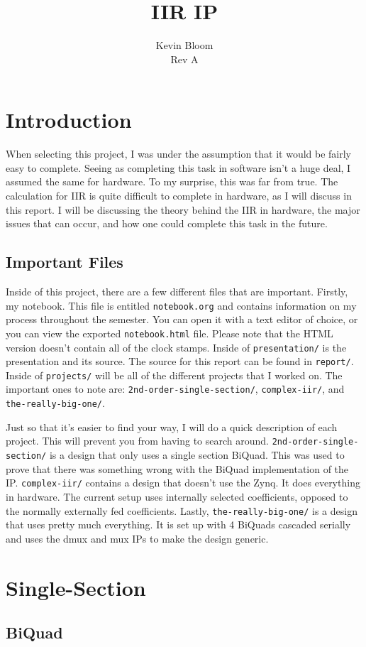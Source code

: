 \documentclass[12pt,a4paper,titlepage]{article}
\begin{document}
\title{IIR IP}
\author{Kevin Bloom \\ Rev A}
\maketitle

\newpage

\tableofcontents

\newpage

\section{Introduction}
When selecting this project, I was under the assumption that it would be fairly
easy to complete. Seeing as completing this task in software isn't a huge deal,
I assumed the same for hardware. To my surprise, this was far from true. The
calculation for IIR is quite difficult to complete in hardware, as I will
discuss in this report. I will be discussing the theory behind the IIR in
hardware, the major issues that can occur, and how one could complete this task
in the future.

\subsection{Important Files}
Inside of this project, there are a few different files that are important.
Firstly, my notebook. This file is entitled \texttt{notebook.org} and contains
information on my process throughout the semester. You can open it with a text
editor of choice, or you can view the exported \texttt{notebook.html}
file. Please note that the HTML version doesn't contain all of the clock
stamps. Inside of \texttt{presentation/} is the presentation and its source. The
source for this report can be found in \texttt{report/}. Inside of
\texttt{projects/} will be all of the different projects that I worked on. The
important ones to note are: \texttt{2nd-order-single-section/},
\texttt{complex-iir/}, and \texttt{the-really-big-one/}.

Just so that it's easier to find your way, I will do a quick description of each
project. This will prevent you from having to search
around. \texttt{2nd-order-single-section/} is a design that only uses a single
section BiQuad. This was used to prove that there was something wrong with the
BiQuad implementation of the IP. \texttt{complex-iir/} contains a design that
doesn't use the Zynq. It does everything in hardware. The current setup uses
internally selected coefficients, opposed to the normally externally fed
coefficients. Lastly, \texttt{the-really-big-one/} is a design that uses pretty
much everything. It is set up with 4 BiQuads cascaded serially and uses the dmux
and mux IPs to make the design generic.

\section{Single-Section}


\subsection{BiQuad}

\appendix

\newpage

\printbibliography[
heading=bibintoc,
title={Resources}
]
\end{document}
